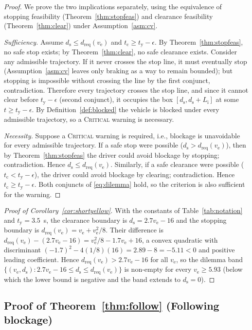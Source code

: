 \documentclass[conference, a4paper]{IEEEtran}
\theoremstyle{plain}
\newcommand{\dreq}{d_{\mathrm{req}}}
\newcommand{\ds}{d_{\mathrm{s}}}
\newcommand{\tclear}{t_{\mathrm{c}}}
\newcommand{\tred}{t_{\mathrm{y}}}
\newcommand{\Li}{L_{\mathrm{i}}}
\newcommand{\ve}{v_{\mathrm{e}}}
\begin{document}
\begin{proof}
We prove the two implications separately, using the equivalence of stopping
feasibility (Theorem~\ref{thm:stopfeas}) and clearance feasibility
(Theorem~\ref{thm:clear}) under Assumption~\ref{asm:cv}.

\textit{Sufficiency.} Assume
$\ds \leq \dreq(\ve)$ and $\tclear \geq \tred - \epsilon$. By
Theorem~\ref{thm:stopfeas}, no safe stop exists; by
Theorem~\ref{thm:clear}, no safe clearance exists. Consider any admissible
trajectory. If it never crosses the stop line, it must eventually stop
(Assumption~\ref{asm:cv} leaves only braking as a way to remain bounded);
but stopping is impossible without crossing the line by the first conjunct,
contradiction. Therefore every trajectory crosses the stop line, and since
it cannot clear before $\tred - \epsilon$ (second conjunct), it occupies
the box $[\ds, \ds+\Li]$ at some $t \geq \tred - \epsilon$. By
Definition~\ref{def:blocked} the vehicle is blocked under every admissible
trajectory, so a \textsc{Critical} warning is necessary.

\textit{Necessity.} Suppose a \textsc{Critical} warning is required, i.e.,
blockage is unavoidable for every admissible trajectory. If a safe stop were
possible ($\ds > \dreq(\ve)$), then by Theorem~\ref{thm:stopfeas} the driver
could avoid blockage by stopping; contradiction. Hence $\ds \leq
\dreq(\ve)$. Similarly, if a safe clearance were possible
($\tclear < \tred - \epsilon$), the driver could avoid blockage by clearing;
contradiction. Hence $\tclear \geq \tred - \epsilon$. Both conjuncts of
\eqref{eq:dilemma} hold, so the criterion is also sufficient for the warning.
\end{proof}

\begin{proof}[Proof of Corollary~\ref{cor:shortyellow}]
With the constants of Table~\ref{tab:notation} and $\tred = 3.5$~s, the
clearance boundary is $\ds = 2.7\ve - 16$ and the stopping boundary is
$\dreq(\ve) = \ve + \ve^2/8$. Their difference is
$\dreq(\ve) - (2.7\ve - 16) = \ve^2/8 - 1.7\ve + 16$, a convex quadratic with
discriminant $(-1.7)^2 - 4(1/8)(16) = 2.89 - 8 = -5.11 < 0$ and positive
leading coefficient. Hence $\dreq(\ve) > 2.7\ve - 16$ for all $\ve$, so the
dilemma band $\{ (\ve,\ds) : 2.7\ve - 16 \leq \ds \leq \dreq(\ve) \}$ is
non-empty for every $\ve \geq 5.93$ (below which the lower bound is negative
and the band extends to $\ds = 0$).
\end{proof}

\subsection{Proof of Theorem~\ref{thm:follow} (Following blockage)}
\end{document}
